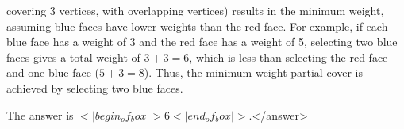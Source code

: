 covering 3 vertices, with overlapping vertices) results in the minimum weight, assuming blue faces have lower weights than the red face. For example, if each blue face has a weight of 3 and the red face has a weight of 5, selecting two blue faces gives a total weight of \(3 + 3 = 6\), which is less than selecting the red face and one blue face (\(5 + 3 = 8\)). Thus, the minimum weight partial cover is achieved by selecting two blue faces.

The answer is \(<|begin_of_box|>6<|end_of_box|>\).</answer>